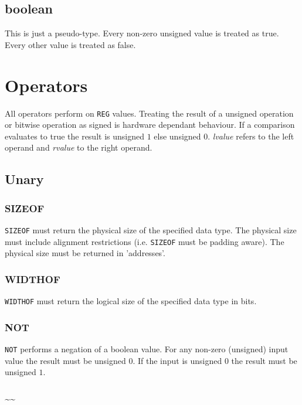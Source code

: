 \subsection{boolean}

This is just a pseudo-type. Every non-zero unsigned value is treated as true. Every other value is treated as false. 

\section{Operators}

All operators perform on \verb|REG| values. Treating the result of a unsigned operation or bitwise operation as signed is hardware dependant behaviour. If a comparison
evaluates to true the result is unsigned $1$ else unsigned $0$. \textit{lvalue} refers to the left operand and \textit{rvalue} to the right operand. 

\subsection{Unary}

\subsubsection{SIZEOF}

\verb|SIZEOF| must return the physical size of the specified data type. The physical size must include alignment restrictions (i.e. \verb|SIZEOF| must be padding aware).
The physical size must be returned in 'addresses'. 

\subsubsection{WIDTHOF}

\verb|WIDTHOF| must return the logical size of the specified data type in bits. 

\subsubsection{NOT}

\verb|NOT| performs a negation of a boolean value. For any non-zero (unsigned) input value the result must be unsigned $0$. If the input is unsigned $0$ the result
must be unsigned $1$. 

\subsubsection{\textasciitilde\textasciitilde}

